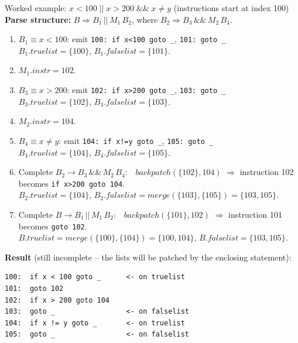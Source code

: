 \documentclass[11pt,a4paper]{article}
\begin{document}
\begin{examplebox}{Worked example: $x < 100 \;||\; x > 200 \;\&\&\; x \ne y$ (instructions start at index 100)}
\textbf{Parse structure:} $B \Rightarrow B_1 \,||\, M_1\, B_2$, where $B_2 \Rightarrow B_3 \,\&\&\, M_2\, B_4$.

\begin{enumerate}[nosep]
\item $B_1 \equiv x<100$: emit \texttt{100: if x<100 goto \_}, \texttt{101: goto \_}\\
 \hspace*{1em} $B_1.truelist=\{100\}$, $B_1.falselist=\{101\}$.
\item $M_1.instr = 102$.
\item $B_3 \equiv x>200$: emit \texttt{102: if x>200 goto \_}, \texttt{103: goto \_}\\
 \hspace*{1em} $B_3.truelist=\{102\}$, $B_3.falselist=\{103\}$.
\item $M_2.instr = 104$.
\item $B_4 \equiv x\ne y$: emit \texttt{104: if x!=y goto \_}, \texttt{105: goto \_}\\
 \hspace*{1em} $B_4.truelist=\{104\}$, $B_4.falselist=\{105\}$.
\item Complete $B_2 \to B_3 \,\&\&\, M_2\, B_4$:\ \ $\mathit{backpatch}(\{102\},104)$ $\Rightarrow$ instruction 102 becomes \texttt{if x>200 goto 104}.\\
 \hspace*{1em} $B_2.truelist=\{104\}$, $B_2.falselist=\mathit{merge}(\{103\},\{105\})=\{103,105\}$.
\item Complete $B \to B_1 \,||\, M_1\, B_2$:\ \ $\mathit{backpatch}(\{101\},102)$ $\Rightarrow$ instruction 101 becomes \texttt{goto 102}.\\
 \hspace*{1em} $B.truelist=\mathit{merge}(\{100\},\{104\})=\{100,104\}$, $B.falselist=\{103,105\}$.
\end{enumerate}
\textbf{Result} (still incomplete -- the lists will be patched by the enclosing statement):
\begin{lstlisting}
100:  if x < 100 goto _      <- on truelist
101:  goto 102
102:  if x > 200 goto 104
103:  goto _                 <- on falselist
104:  if x != y goto _       <- on truelist
105:  goto _                 <- on falselist
\end{lstlisting}


\end{examplebox}
\end{document}
